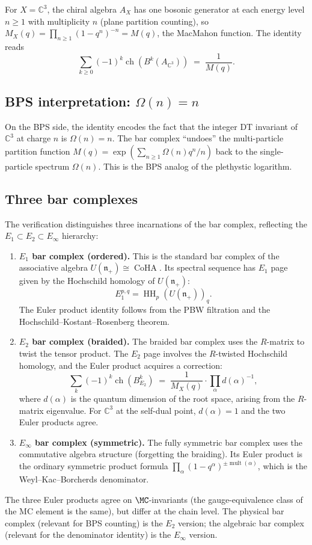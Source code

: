 \documentclass[11pt]{article}
\theoremstyle{definition}
\theoremstyle{remark}
\DeclareMathOperator{\mult}{mult}
\DeclareMathOperator{\ch}{ch}
\DeclareMathOperator{\HH}{HH}
\DeclareMathOperator{\CoHA}{CoHA}
\newcommand{\frakn}{\mathfrak{n}}
\begin{document}
For $X = \mathbb{C}^3$, the chiral algebra $A_X$ has one bosonic
generator at each energy level $n \geq 1$ with multiplicity $n$
(plane partition counting), so
$M_X(q) = \prod_{n \geq 1} (1 - q^n)^{-n} = M(q)$, the MacMahon
function. The identity reads
\[
 \sum_{k \geq 0} (-1)^k \ch(B^k(A_{\mathbb{C}^3}))
 \;=\; \frac{1}{M(q)}.
\]

\subsection{BPS interpretation: $\Omega(n) = n$}

On the BPS side, the identity encodes the fact that the integer
DT invariant of $\mathbb{C}^3$ at charge $n$ is
$\Omega(n) = n$. The bar complex ``undoes'' the
multi-particle partition function $M(q) = \exp(\sum_{n \geq 1}
\Omega(n) q^n / n)$ back to the single-particle spectrum
$\Omega(n)$. This is the BPS analog of the plethystic logarithm.

\subsection{Three bar complexes}

The verification distinguishes three incarnations of the bar
complex, reflecting the $E_1 \subset E_2 \subset E_\infty$
hierarchy:

\begin{enumerate}[label=(\roman*)]
 \item \textbf{$E_1$ bar complex (ordered).}
 This is the standard bar complex of the associative algebra
 $U(\frakn_+) \cong \CoHA$. Its spectral sequence has $E_1$
 page given by the Hochschild homology of $U(\frakn_+)$:
 \[
 E_1^{p,q} = \HH_p(U(\frakn_+))_q.
 \]
 The Euler product identity follows from the PBW filtration
 and the Hochschild--Kostant--Rosenberg theorem.

 \item \textbf{$E_2$ bar complex (braided).}
 The braided bar complex uses the $R$-matrix to twist the
 tensor product. The $E_2$ page involves the
 $R$-twisted Hochschild homology, and the Euler product
 acquires a correction:
 \[
 \sum_k (-1)^k \ch(B^k_{E_2}) \;=\;
 \frac{1}{M_X(q)} \cdot \prod_{\alpha} d(\alpha)^{-1},
 \]
 where $d(\alpha)$ is the quantum dimension of the root
 space, arising from the $R$-matrix eigenvalue. For
 $\mathbb{C}^3$ at the self-dual point, $d(\alpha) = 1$ and
 the two Euler products agree.

 \item \textbf{$E_\infty$ bar complex (symmetric).}
 The fully symmetric bar complex uses the commutative algebra
 structure (forgetting the braiding). Its Euler product is
 the ordinary symmetric product formula
 $\prod_\alpha (1 - q^\alpha)^{\pm \mult(\alpha)}$, which
 is the Weyl--Kac--Borcherds denominator.
\end{enumerate}

\noindent
The three Euler products agree on $\overline{\MC}$-invariants
(the gauge-equivalence class of the MC element is the same),
but differ at the chain level. The physical bar complex
(relevant for BPS counting) is the $E_2$ version; the
algebraic bar complex (relevant for the denominator identity)
is the $E_\infty$ version.
\end{document}
